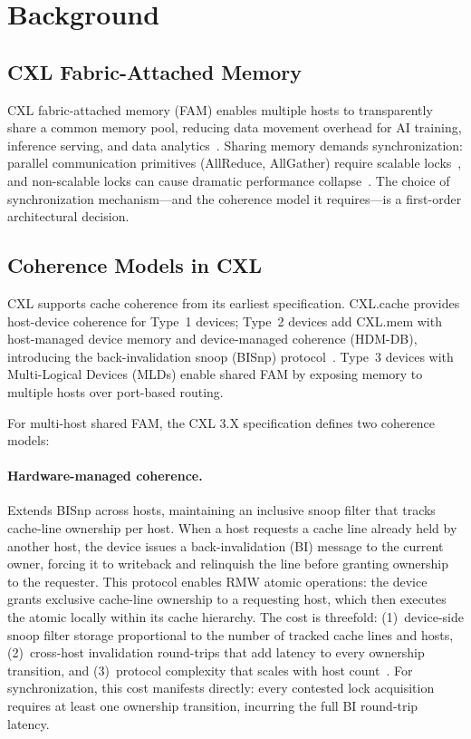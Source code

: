 \section{Background}

\subsection{CXL Fabric-Attached Memory}

CXL fabric-attached memory (FAM) enables multiple hosts to transparently share a common memory pool, reducing data movement overhead for AI training, inference serving, and data analytics~\cite{tangYggdrasilReducingNetwork2024,zhongMyCXLPool2025,liPondCXLBasedMemory2023,goukDirectAccessHighPerformance}.
Sharing memory demands synchronization: parallel communication primitives (AllReduce, AllGather) require scalable locks~\cite{dangAdvancedThreadSynchronization2017}, and non-scalable locks can cause dramatic performance collapse~\cite{boyd-wickizerNonscalableLocksAre}.
The choice of synchronization mechanism---and the coherence model it requires---is a first-order architectural decision.

\subsection{Coherence Models in CXL}

CXL supports cache coherence from its earliest specification.
CXL.cache provides host-device coherence for Type~1 devices; Type~2 devices add CXL.mem with host-managed device memory and device-managed coherence (HDM-DB), introducing the back-invalidation snoop (BISnp) protocol~\cite{sharmaIntroductionComputeExpress}.
Type~3 devices with Multi-Logical Devices (MLDs) enable shared FAM by exposing memory to multiple hosts over port-based routing.

For multi-host shared FAM, the CXL 3.X specification defines two coherence models:

\paragraph{Hardware-managed coherence.}
Extends BISnp across hosts, maintaining an inclusive snoop filter that tracks cache-line ownership per host.
When a host requests a cache line already held by another host, the device issues a back-invalidation (BI) message to the current owner, forcing it to writeback and relinquish the line before granting ownership to the requester.
This protocol enables RMW atomic operations: the device grants exclusive cache-line ownership to a requesting host, which then executes the atomic locally within its cache hierarchy.
The cost is threefold: (1)~device-side snoop filter storage proportional to the number of tracked cache lines and hosts, (2)~cross-host invalidation round-trips that add latency to every ownership transition, and (3)~protocol complexity that scales with host count~\cite{goukDirectAccessHighPerformance}.
For synchronization, this cost manifests directly: every contested lock acquisition requires at least one ownership transition, incurring the full BI round-trip latency.

